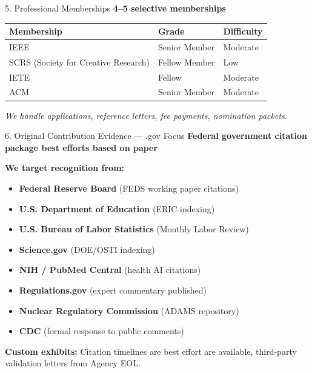 \documentclass[aspectratio=169, 10pt]{beamer}
\begin{document}
	\begin{frame}{5. Professional Memberships}
		\faUsers \hspace{0.2cm} \textbf{4–5 selective memberships}
		
		\begin{center}
			\small
			\begin{tabular}{lll}
				\toprule
				Membership & Grade & Difficulty \\
				\midrule
				IEEE & Senior Member & Moderate \\
				SCRS (Society for Creative Research) & Fellow Member & Low \\
				IETE & Fellow & Moderate \\
				ACM & Senior Member & Moderate \\
				\bottomrule
			\end{tabular}
		\end{center}
		
		\textit{We handle applications, reference letters, fee payments, nomination packets.}
	\end{frame}
	
	\begin{frame}{6. Original Contribution Evidence — .gov Focus}
		\faMicrochip \hspace{0.2cm} \textbf{Federal government citation package best efforts based on paper}
		
		\textbf{We target recognition from:}
		\begin{itemize}
			\item \textbf{Federal Reserve Board} (FEDS working paper citations)
			\item \textbf{U.S. Department of Education} (ERIC indexing)
			\item \textbf{U.S. Bureau of Labor Statistics} (Monthly Labor Review)
			\item \textbf{Science.gov} (DOE/OSTI indexing)
			\item \textbf{NIH / PubMed Central} (health AI citations)
			\item \textbf{Regulations.gov} (expert commentary published)
			\item \textbf{Nuclear Regulatory Commission} (ADAMS repository)
			\item \textbf{CDC} (formal response to public comments)
		\end{itemize}
		
		\textbf{Custom exhibits:} Citation  timelines are best effort are available, third-party validation letters from Agency EOL.
	\end{frame}
	
\end{document}
